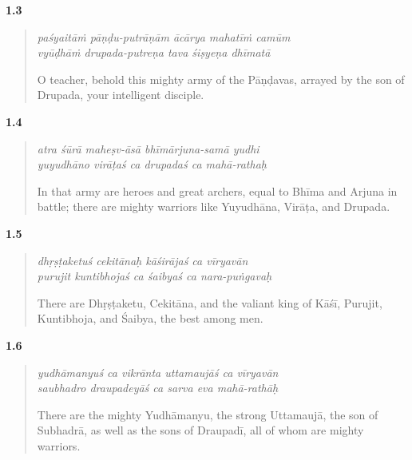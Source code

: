 \par\noindent\textbf{1.3}\par
\begin{verse}
\textit{paśyaitāṁ pāṇḍu-putrāṇām ācārya mahatīṁ camūm} \\
\textit{vyūḍhāṁ drupada-putreṇa tava śiṣyeṇa dhīmatā}

\noindent O teacher, behold this mighty army of the Pāṇḍavas, arrayed by the son of Drupada, your intelligent disciple.
\end{verse}
\par



\par\noindent\textbf{1.4}\par
\begin{verse}
\textit{atra śūrā maheṣv-āsā bhīmārjuna-samā yudhi} \\
\textit{yuyudhāno virāṭaś ca drupadaś ca mahā-rathaḥ}

\noindent In that army are heroes and great archers, equal to Bhīma and Arjuna in battle; there are mighty warriors like Yuyudhāna, Virāṭa, and Drupada.
\end{verse}
\par



\par\noindent\textbf{1.5}\par
\begin{verse}
\textit{dhṛṣṭaketuś cekitānaḥ kāśirājaś ca vīryavān} \\
\textit{purujit kuntibhojaś ca śaibyaś ca nara-puṅgavaḥ}

\noindent There are Dhṛṣṭaketu, Cekitāna, and the valiant king of Kāśī, Purujit, Kuntibhoja, and Śaibya, the best among men.
\end{verse}
\par



\par\noindent\textbf{1.6}\par
\begin{verse}
\textit{yudhāmanyuś ca vikrānta uttamaujāś ca vīryavān} \\
\textit{saubhadro draupadeyāś ca sarva eva mahā-rathāḥ}

\noindent There are the mighty Yudhāmanyu, the strong Uttamaujā, the son of Subhadrā, as well as the sons of Draupadī, all of whom are mighty warriors.
\end{verse}
\par



